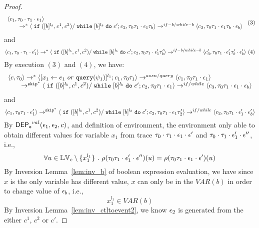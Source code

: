 {\begin{proof}
\[\begin{array}{l}
 \langle c_1, \mathtt{\tau}_0 \cdot \mathtt{\tau}_1 \cdot \mathtt{\epsilon}_1 \rangle 
  \\ 
  \qquad \rightarrow^{*} 
  \langle \;\mathtt{if}\;([b]{}^{l_b}, c^1, c^2) / \;\mathtt{while}\; [b]{}^{l_b} \;\mathtt{do}\; c'; {c}_2, 
  \mathtt{\tau}_0 \mathtt{\tau}_1 \cdot \mathtt{\epsilon}_1 \mathtt{\tau}_b \rangle 
  \rightarrow^{if-b / while-b} 
  \langle {c}_3,  \mathtt{\tau}_0 \mathtt{\tau}_1 \cdot \mathtt{\epsilon}_1 \mathtt{\tau}_b \cdot \mathtt{\epsilon}_b \rangle 
\end{array} ~ (3)
 \]
and 
 \[
  \langle c_1, \mathtt{\tau}_0 \cdot \mathtt{\tau}_1 \cdot \mathtt{\epsilon}_1' \rangle 
  \rightarrow^{*} 
  \langle \;\mathtt{if}\;([b]{}^{l_b}, c^1, c^2) / \;\mathtt{while}\; [b]{}^{l_b} \;\mathtt{do}\; c'; {c}_2, 
  \mathtt{\tau}_0 \mathtt{\tau}_1 \cdot \mathtt{\epsilon}_1' \mathtt{\tau}_b' \rangle 
  \rightarrow^{if-b / while-b} 
  \langle {c}_3',  \mathtt{\tau}_0 \mathtt{\tau}_1 \cdot \mathtt{\epsilon}_1' \mathtt{\tau}_b' \cdot \mathtt{\epsilon}_b' \rangle 
  ~(4)
 \]
 By execution $(3)$ and $(4)$, we have:
\[
  \begin{array}{l}   
  \langle {c}, \mathtt{\tau}_0 \rangle 
  \rightarrow^{*} 
  \langle [\mathrel{ {x}_1 \leftarrow e_1~ or ~ {\tt query}(\psi_1) }]^{l_1} ; {c}_1, \mathtt{\tau}_0 \mathtt{\tau}_1 \rangle  \rightarrow^{assn/query}
 \langle c_1, \mathtt{\tau}_0 \mathtt{\tau}_1 \cdot \mathtt{\epsilon}_1 \rangle 
  \\ 
  \qquad \rightarrow^{\mathtt{skip}^*} 
  \langle \;\mathtt{if}\;([b]{}^{l_b}, c^1, c^2) / \;\mathtt{while}\; [b]{}^{l_b} \;\mathtt{do}\; c'; {c}_2, 
  \mathtt{\tau}_0 \mathtt{\tau}_1 \cdot \mathtt{\epsilon}_1 \rangle 
  \rightarrow^{if / while} 
  \langle {c}_3,  \mathtt{\tau}_0 \mathtt{\tau}_1 \cdot \mathtt{\epsilon}_1 \cdot \mathtt{\epsilon}_b \rangle 
\end{array}
 \]
and 
 \[
  \langle c_1, \mathtt{\tau}_0 \mathtt{\tau}_1 \cdot \mathtt{\epsilon}_1' \rangle 
  \rightarrow^{\mathtt{skip}^*} 
  \langle \;\mathtt{if}\;([b]{}^{l_b}, c^1, c^2) / \;\mathtt{while}\; [b]{}^{l_b} \;\mathtt{do}\; c'; {c}_2, 
  \mathtt{\tau}_0 \mathtt{\tau}_1 \cdot \mathtt{\epsilon}_1 \mathtt{\tau}_2' \rangle 
  \rightarrow^{if / while} 
  \langle {c}_2,  \mathtt{\tau}_0 \mathtt{\tau}_1 \cdot \mathtt{\epsilon}_1' \cdot \mathtt{\epsilon}_b' \rangle 
 \]
By $\mathsf{DEP_{\mathtt{e}}}^{val}(\mathtt{\epsilon}_1, \mathtt{\epsilon}_2, c)$, and definition of environment, 
the environment only able to obtain different values for variable $x_1$ 
from trace $\mathtt{\tau}_0 \cdot \mathtt{\tau}_1 \cdot \mathtt{\epsilon}_1 \cdot \mathtt{\epsilon}'$ and 
$\mathtt{\tau}_0 \cdot \mathtt{\tau}_1 \cdot \mathtt{\epsilon}_1' \cdot \mathtt{\epsilon}''$, i.e.,
\[
  \forall u \in \mathbb{LV}_c \setminus \{x_1^{l_1}\} ~.~
  \rho(\mathtt{\tau}_0 \mathtt{\tau}_1 \cdot \mathtt{\epsilon}_1' \cdot \mathtt{\epsilon}'') (u) =  
  \rho(\mathtt{\tau}_0 \mathtt{\tau}_1 \cdot \mathtt{\epsilon}_1 \cdot \mathtt{\epsilon}') (u)
\]
%
By {Inversion Lemma~\ref{lem:inv_b}} of boolean expression evaluation, we have since $x$ is the only variable has different value, $x$ can only be in the $VAR(b)$ in order to change value of $\mathtt{\epsilon}_b$, i.e.,
 \[
  x_1^{l_1} \in VAR(b)
 \]
 By {Inversion Lemma~\ref{lem:inv_ctltoevent2}}, we know $\mathtt{\epsilon}_2$ is generated from the either $c^1$, $c^2$ or $c'$.

\end{proof}}
